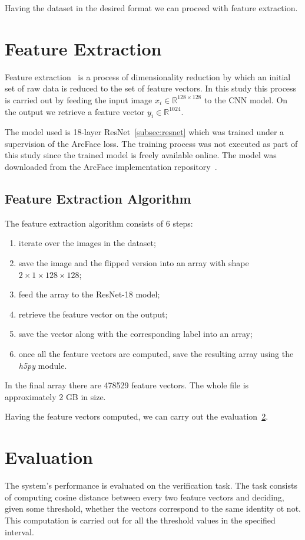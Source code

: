 Having the dataset in the desired format we can proceed with feature extraction.

\section{Feature Extraction}\label{sec:feature-extraction}
Feature extraction~\cite{FeEx} is a process of dimensionality reduction by which an initial set of raw data
is reduced to the set of feature vectors.
In this study this process is carried out by feeding the input image $x_i \in \mathbb{R}^{128\times128 }$ to the CNN model.
On the output we retrieve a feature vector $y_i \in \mathbb{R}^{1024}$.

The model used is 18-layer ResNet~\ref{subsec:resnet} which was trained under a supervision of the ArcFace loss.
The training process was not executed as part of this study since the trained model is freely available online.
The model was downloaded from the ArcFace implementation repository~\cite{ArcFacePyTorch}.

\subsection{Feature Extraction Algorithm}\label{subsec:feexalgo}
The feature extraction algorithm consists of 6 steps:
\begin{enumerate}
    \item iterate over the images in the dataset;
    \item save the image and the flipped version into an array with shape $2\times1\times128\times128$;
    \item feed the array to the ResNet-18 model;
    \item retrieve the feature vector on the output;
    \item save the vector along with the corresponding label into an array;
    \item once all the feature vectors are computed, save the resulting array using the \textit{h5py} module.
\end{enumerate}

In the final array there are 478529 feature vectors.
The whole file is approximately 2 GB in size.

Having the feature vectors computed, we can carry out the evaluation~\ref{sec:evaluation}.

\section{Evaluation}\label{sec:evaluation}
The system's performance is evaluated on the verification task.
The task consists of computing cosine distance between every two feature
vectors and deciding, given some threshold, whether the vectors correspond to the same identity ot not.
This computation is carried out for all the threshold values in the specified interval.

